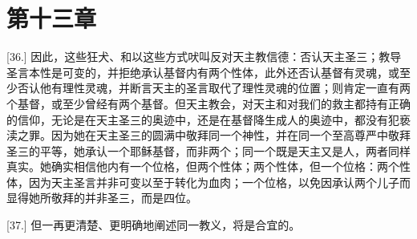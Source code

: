 
\section{第十三章}

\par

[36.] 因此，这些狂犬、和以这些方式吠叫反对天主教信德：否认天主圣三；教导圣言本性是可变的，并拒绝承认基督内有两个性体，此外还否认基督有灵魂，或至少否认他有理性灵魂，并断言天主的圣言取代了理性灵魂的位置；则肯定一直有两个基督，或至少曾经有两个基督。但天主教会，对天主和对我们的救主都持有正确的信仰，无论是在天主圣三的奥迹中，还是在基督降生成人的奥迹中，都没有犯亵渎之罪。因为她在天主圣三的圆满中敬拜同一个神性，并在同一个至高尊严中敬拜圣三的平等，她承认一个耶稣基督，而非两个；同一个既是天主又是人，两者同样真实。她确实相信他内有一个位格，但两个性体；两个性体，但一个位格：两个性体，因为天主圣言并非可变以至于转化为血肉；一个位格，以免因承认两个儿子而显得她所敬拜的并非圣三，而是四位。\par

[37.] 但一再更清楚、更明确地阐述同一教义，将是合宜的。\par

